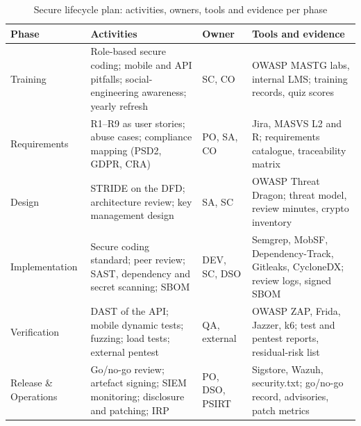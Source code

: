 \begin{table}[!htbp]
\caption{Secure lifecycle plan: activities, owners, tools and evidence per phase}
\label{tab:lifecycle}
\centering
\scriptsize
\begin{tabularx}{\columnwidth}{@{}L{1.55cm}Y L{0.95cm}Y@{}}
\toprule
\textbf{Phase} & \textbf{Activities} & \textbf{Owner} & \textbf{Tools and evidence} \\
\midrule
Training & Role-based secure coding; mobile and \ac{API} pitfalls; social-engineering awareness; yearly refresh & SC, CO & OWASP MASTG labs, internal LMS; training records, quiz scores \\
Requirements & R1--R9 as user stories; abuse cases; compliance mapping (\ac{PSD2}, \ac{GDPR}, \ac{CRA}) & PO, SA, CO & Jira, \ac{MASVS} L2 and R; requirements catalogue, traceability matrix \\
Design & \ac{STRIDE} on the \ac{DFD}; architecture review; key management design & SA, SC & OWASP Threat Dragon; threat model, review minutes, crypto inventory \\
Implementation & Secure coding standard; peer review; \ac{SAST}, dependency and secret scanning; \ac{SBOM} & DEV, SC, DSO & Semgrep, MobSF, Dependency-Track, Gitleaks, CycloneDX; review logs, signed \ac{SBOM} \\
Verification & \ac{DAST} of the \ac{API}; mobile dynamic tests; fuzzing; load tests; external pentest & QA, external & OWASP ZAP, Frida, Jazzer, k6; test and pentest reports, residual-risk list \\
Release \& Operations & Go/no-go review; artefact signing; \ac{SIEM} monitoring; disclosure and patching; \ac{IRP} & PO, DSO, \ac{PSIRT} & Sigstore, Wazuh, security.txt; go/no-go record, advisories, patch metrics \\
\bottomrule
\end{tabularx}
\end{table}